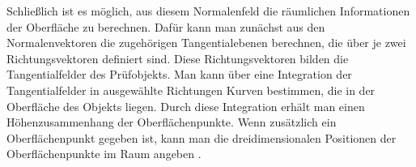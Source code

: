 \p
Schließlich ist es möglich, aus diesem Normalenfeld die räumlichen Informationen der Oberfläche zu berechnen.
Dafür kann man zunächst aus den Normalenvektoren die zugehörigen Tangentialebenen berechnen, die über je zwei Richtungsvektoren definiert sind.
Diese Richtungsvektoren bilden die Tangentialfelder des Prüfobjekts.
Man kann über eine Integration der Tangentialfelder in ausgewählte Richtungen Kurven bestimmen, die in der Oberfläche des Objekts liegen.
Durch diese Integration erhält man einen Höhenzusammen\-hang der Oberflächenpunkte.
Wenn zusätzlich ein Oberflächenpunkt gegeben ist, kann man die dreidimensionalen Positionen der Oberflächenpunkte im Raum angeben \cite{kit_werling}.